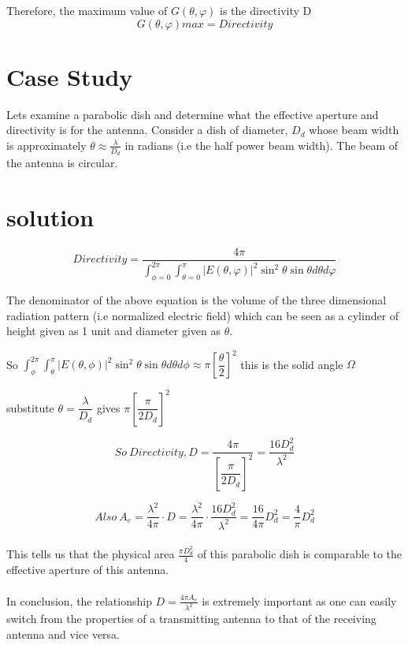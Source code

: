 Therefore, the maximum value of $G(\theta, \varphi)$ is the directivity D
$$G(\theta, \varphi)max=Directivity$$

\section*{\centering Case Study}
Lets examine a parabolic dish and determine what the effective aperture and directivity is for the antenna. Consider a dish of diameter, $D_{d}$ whose beam width is approximately $\theta\approx \frac{\lambda}{D_{d}}$ in radians (i.e the half power beam width). The beam of the antenna is circular.
\section*{\centering solution}


$$Directivity=\dfrac{4\pi}{\int_{\phi=0}^{2\pi}\int_{\theta=0}^{\pi}|E(\theta,\varphi)|^{2}\sin^{2}\theta \sin\theta d\theta d\varphi} $$
\newline

The denominator of the above equation is the volume of the three dimensional radiation pattern (i.e normalized electric field) which can be seen as a cylinder of height given as 1 unit and diameter given as $\theta$.

So $\int_{\phi}^{2\pi}\int_{\theta}^{\pi}|E(\theta,\phi)|^{2}\sin^{2}\theta \sin\theta d\theta d\phi \approx \pi\left[\dfrac{\theta}{2}\right]^{2}$ this is the solid angle $\Omega$

substitute $\theta = \dfrac{\lambda}{D_{d}}$ gives  $\pi\left[\dfrac{\pi}{2D_{d}}\right]^{2}$

$$So \ Directivity, D= \dfrac{4\pi}{\left[\dfrac{\pi}{2D_{d}}\right]^{2}} = \frac{16D_{d}^{2}}{\lambda^{2}}$$

$$Also \ A_{e}=\frac{\lambda^{2}}{4\pi} \cdot D = \frac{\lambda^{2}}{4\pi} \cdot \frac{16D_{d}^{2}}{\lambda^{2}} = \frac{16}{4\pi}D_{d}^{2} = \frac{4}{\pi}D_{d}^{2}$$

\paragraph{}This tells us that the physical area $\frac{\pi D_d^2}{4}$ of this parabolic dish is comparable to the effective aperture of this antenna.

\paragraph{}In conclusion, the relationship $D=\frac{4\pi A_{e}}{\lambda^{2}}$ is extremely important as one can easily switch from the properties of a transmitting antenna to that of the receiving antenna and vice versa.